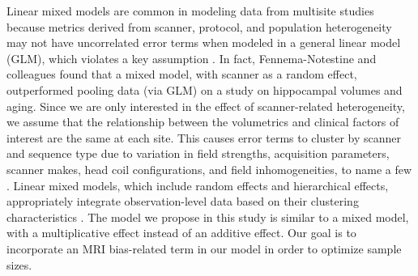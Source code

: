 Linear mixed models are common in modeling data from multisite studies because metrics derived from scanner, protocol, and population heterogeneity may not have uncorrelated error terms when modeled in a general linear model (GLM), which violates a key assumption \cite{garson2013fundamentals}. In fact, Fennema-Notestine and colleagues found that a mixed model, with scanner as a random effect, outperformed pooling data (via GLM)\cite{fennema2007feasibility} on a study on hippocampal volumes and aging. Since we are only interested in the effect of scanner-related heterogeneity, we assume that the relationship between the volumetrics and clinical factors of interest are the same at each site. This causes error terms to cluster by scanner and sequence type due to variation in field strengths, acquisition parameters, scanner makes, head coil configurations, and field inhomogeneities, to name a few \cite{cannon2014}. Linear mixed models, which include random effects and hierarchical effects, appropriately integrate observation-level data based on their clustering characteristics \cite{garson2013fundamentals}. The model we propose in this study is similar to a mixed model, with a multiplicative effect instead of an additive effect. Our goal is to incorporate an MRI bias-related term in our model in order to optimize sample sizes.